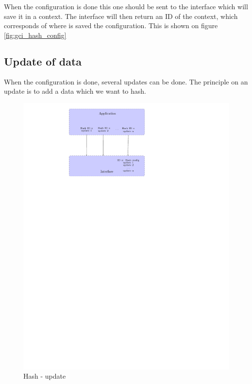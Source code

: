 When the configuration is done this one should be sent to the interface which
will save it in a context.
The interface will then return an ID of the context, which corresponds of
where is saved the configuration.
This is shown on figure \ref{fig:gci_hash_config} 

\subsection*{Update of data}

When the configuration is done, several updates can be done.
The principle on an update is to add a data which we want to hash.

\begin{figure}[!ht]
\centering
\includegraphics[trim=8cm 20cm 9.5cm 0cm]{figures/hash_example_update.pdf}
\caption{Hash - update\newline}
\label{fig:gci_hash_update}
\end{figure}

